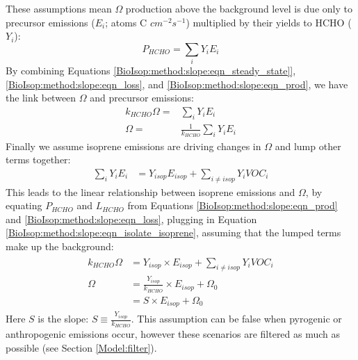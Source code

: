     These assumptions mean $\Omega$ production above the background level is due only to precursor emissions ($E_i$; atoms C $cm^{-2} s^{-1}$) multiplied by their yields to HCHO ($Y_i$):
    \begin{equation}
      \label{BioIsop:method:slope:eqn_prod}
      P_{HCHO}  = \sum_i Y_i E_i 
    \end{equation}
    By combining Equations \ref{BioIsop:method:slope:eqn_steady_state]}, \ref{BioIsop:method:slope:eqn_loss}, and \ref{BioIsop:method:slope:eqn_prod}, we have the link between $\Omega$ and precursor emissions:
    \begin{eqnarray*}
      k_{HCHO} \Omega = & \sum_i Y_i E_i \\
      \Omega = & \frac{1}{k_{HCHO}} \sum_i Y_i E_i
    \end{eqnarray*}
    Finally we assume isoprene emissions are driving changes in $\Omega$ \parencite[as performed elsewhere, e.g.][]{Palmer2003,Millet2008,Marais2014,Stavrakou2015} and lump other terms together:
    \begin{eqnarray}
      \label{BioIsop:method:slope:eqn_isolate_isoprene}
      \sum_i Y_i E_i  & = Y_{isop} E_{isop} + \sum_{i \ne isop} Y_{i} VOC_{i} 
    \end{eqnarray}
    This leads to the linear relationship between isoprene emissions and $\Omega$, by equating $P_{HCHO}$ and $L_{HCHO}$ from Equations \ref{BioIsop:method:slope:eqn_prod} and \ref{BioIsop:method:slope:eqn_loss}, plugging in Equation \ref{BioIsop:method:slope:eqn_isolate_isoprene}, assuming that the lumped terms make up the background:
    \begin{eqnarray} 
      \label{BioIsop:method:slope:eqn_isop_to_hcho}
      \begin{split}
        k_{HCHO}\Omega 
        & = Y_{isop} \times E_{isop} + \sum_{i \ne isop} Y_{i} VOC_{i} \\
        \Omega 
        & = \frac{Y_{isop}}{k_{HCHO}} \times E_{isop} + \Omega_0 \\
        & = S \times E_{isop} + \Omega_0
      \end{split} 
    \end{eqnarray}
    Here $S$ is the slope: $S \equiv \frac{Y_{isop}}{k_{HCHO}}$.
    This assumption can be false when pyrogenic or anthropogenic emissions occur, however these scenarios are filtered as much as possible (see Section \ref{Model:filter}).
    

